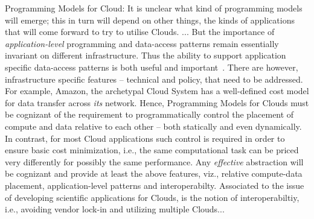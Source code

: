 \documentclass[conference,final]{IEEEtran}
\begin{document}
Programming Models for Cloud: It is unclear what kind of programming
models will emerge; this in turn will depend on other things, the
kinds of applications that will come forward to try to utilise Clouds.
...  But the importance of {\it application-level} programming and
data-access patterns remain essentially invariant on different
infrastructure. Thus the ability to support application specific
data-access patterns is both useful and important~\cite{dpa-paper}.
There are however, infrastructure specific features -- technical and
policy, that need to be addressed. For example, Amazon, the archetypal
Cloud System has a well-defined cost model for data transfer across
{\it its} network. Hence, Programming Models for Clouds must be
cognizant of the requirement to programmatically control the placement
of compute and data relative to each other -- both statically and even
dynamically.  %
In contrast, for most Cloud applications such control is required in
order to ensure basic cost minimization, i.e., the same computational
task can be priced very differently for possibly the same performance.
Any {\it effective} abstraction will be cognizant and provide at least
the above features, viz., relative compute-data placement,
application-level patterns and interoperabilty.  Associated to the
issue of developing scientific applications for Clouds, is the notion
of interoperabiltiy, i.e., avoiding vendor lock-in and utilizing
multiple Clouds...
\end{document}

